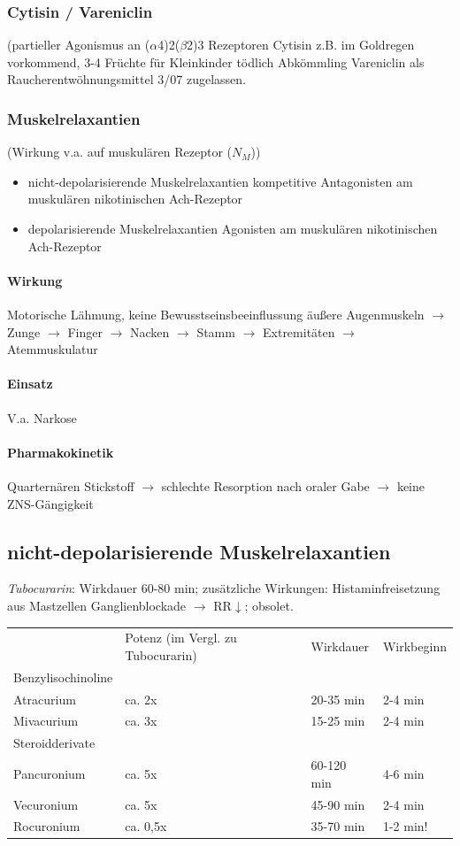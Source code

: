 \documentclass[10pt,a4paper]{report}
\begin{document}
\subsubsection{Cytisin / Vareniclin}(partieller Agonismus an ($\alpha$4)2($\beta$2)3 Rezeptoren Cytisin z.B. im Goldregen vorkommend, 3-4 Früchte für Kleinkinder tödlich Abkömmling Vareniclin als Raucherentwöhnungsmittel 3/07 zugelassen.
\subsubsection{Muskelrelaxantien}(Wirkung v.a. auf muskulären Rezeptor ($N_M$))
\begin{itemize}
	\item nicht-depolarisierende Muskelrelaxantien kompetitive Antagonisten am muskulären nikotinischen Ach-Rezeptor
	\item depolarisierende Muskelrelaxantien Agonisten am muskulären nikotinischen Ach-Rezeptor
\end{itemize}
\paragraph{Wirkung} Motorische Lähmung, keine Bewusstseinsbeeinflussung
äußere Augenmuskeln $\rightarrow$ Zunge $\rightarrow$ Finger $\rightarrow$ Nacken $\rightarrow$ Stamm $\rightarrow$ Extremitäten $\rightarrow$ Atemmuskulatur
\paragraph{Einsatz} V.a. Narkose
\paragraph{Pharmakokinetik} Quarternären Stickstoff $\rightarrow$ schlechte Resorption nach oraler Gabe $\rightarrow$ keine ZNS-Gängigkeit
\subsection{nicht-depolarisierende Muskelrelaxantien}
\textit{Tubocurarin}: Wirkdauer 60-80 min; zusätzliche Wirkungen: Histaminfreisetzung aus Mastzellen Ganglienblockade $\rightarrow$ RR$\downarrow$;  obsolet.
\begin{tabularx}{\textwidth}{XXXX}
&Potenz (im Vergl. zu Tubocurarin)&Wirkdauer&Wirkbeginn\\
Benzylisochinoline&&&\\
Atracurium&ca. 2x&20-35 min&2-4 min\\
Mivacurium&ca. 3x&15-25 min&2-4 min\\
Steroidderivate&&&\\
Pancuronium&ca. 5x&60-120 min&4-6 min\\
Vecuronium&ca. 5x&45-90 min&2-4 min\\
Rocuronium&ca. 0,5x&35-70 min&1-2 min!\\
\end{tabularx}
\end{document}
